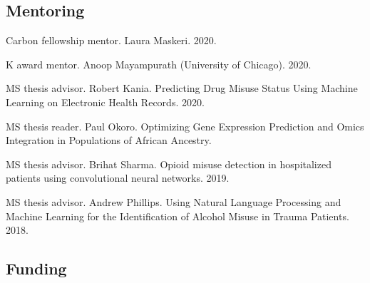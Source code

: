 \documentclass[letterpaper]{article}
\renewenvironment{itemize}{
  \begin{list}{}{
    \setlength{\leftmargin}{1.5em}
  }
}{
  \end{list}
}
\begin{document}
\subsection*{Mentoring}

\begin{itemize}
\item Carbon fellowship mentor. Laura Maskeri. 2020.
\item K award mentor. Anoop Mayampurath (University of Chicago). 2020.
\item MS thesis advisor. Robert Kania. Predicting Drug Misuse Status Using Machine Learning on Electronic Health Records. 2020.
\item MS thesis reader. Paul Okoro. Optimizing Gene Expression Prediction and Omics Integration in Populations of African Ancestry.
\item MS thesis advisor. Brihat Sharma. Opioid misuse detection in hospitalized patients using convolutional neural networks. 2019.
\item MS thesis advisor. Andrew Phillips. Using Natural Language Processing and Machine Learning for the Identification of Alcohol Misuse in Trauma Patients. 2018.
\end{itemize}

\subsection*{Funding}
\end{document}
